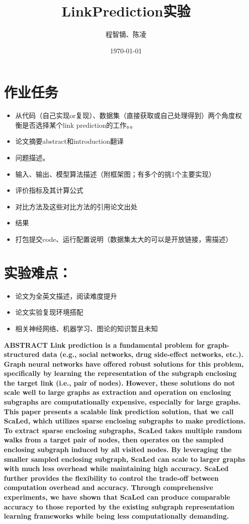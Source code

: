 \documentclass{article}
\title{LinkPrediction实验}
\author{程智镝、陈凌}
\date{\today}
\begin{document}
\maketitle

\section*{作业任务}
\begin{itemize}
    \item 从代码（自己实现or复现）、数据集（直接获取或自己处理得到）两个角度权衡是否选择某个link prediction的工作。。
    \item 论文摘要abstract和introduction翻译
    \item 问题描述。
    \item 输入、输出、模型算法描述（附框架图；有多个的挑1个主要实现）
    \item 评价指标及其计算公式
    \item 对比方法及这些对比方法的引用论文出处
    \item 结果
    \item 打包提交code、运行配置说明（数据集太大的可以是开放链接，需描述）
\end{itemize}
\section*{实验难点：}
\begin{itemize}
    \item 论文为全英文描述，阅读难度提升
    \item 论文实验复现环境搭配
    \item 相关神经网络、机器学习、图论的知识暂且未知
\end{itemize}

\textbf{ABSTRACT
Link prediction is a fundamental problem for graph-structured data
(e.g., social networks, drug side-effect networks, etc.). Graph neural
networks have offered robust solutions for this problem, specifically by learning the representation of the subgraph enclosing the
target link (i.e., pair of nodes). However, these solutions do not
scale well to large graphs as extraction and operation on enclosing subgraphs are computationally expensive, especially for large
graphs. This paper presents a scalable link prediction solution, that
we call ScaLed, which utilizes sparse enclosing subgraphs to make
predictions. To extract sparse enclosing subgraphs, ScaLed takes
multiple random walks from a target pair of nodes, then operates
on the sampled enclosing subgraph induced by all visited nodes.
By leveraging the smaller sampled enclosing subgraph, ScaLed
can scale to larger graphs with much less overhead while maintaining high accuracy. ScaLed further provides the flexibility to
control the trade-off between computation overhead and accuracy.
Through comprehensive experiments, we have shown that ScaLed
can produce comparable accuracy to those reported by the existing subgraph representation learning frameworks while being less
computationally demanding.}\\
\end{document}
